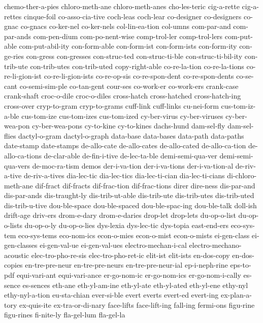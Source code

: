 {chemo-ther-a-pies
chloro-meth-ane
chloro-meth-anes
cho-les-teric
cig-a-rette
cig-a-rettes
cinque-foil
co-asso-cia-tive
coch-leas
coch-lear
co-designer
co-designers
co-gnac
co-gnacs
co-ker-nel
co-ker-nels
col-lin-ea-tion
col-umns
com-par-and
com-par-ands
com-pen-dium
com-po-nent-wise
comp-trol-ler
comp-trol-lers
com-put-able
com-put-abil-ity
con-form-able
con-form-ist
con-form-ists
con-form-ity
con-ge-ries
con-gress
con-gresses
con-struc-ted
con-struc-ti-ble
con-struc-ti-bil-ity
con-trib-ute
con-trib-utes
con-trib-uted
copy-right-able
co-re-la-tion
co-re-la-tions
co-re-li-gion-ist
co-re-li-gion-ists
co-re-op-sis
co-re-spon-dent
co-re-spon-dents
co-se-cant
co-semi-sim-ple
co-tan-gent
cour-ses
co-work-er
co-work-ers
crank-case
crank-shaft
croc-o-dile
croc-o-diles
cross-hatch
cross-hatched
cross-hatch-ing
cross-over
cryp-to-gram
cryp-to-grams
cuff-link
cuff-links
cu-nei-form
cus-tom-iz-a-ble
cus-tom-ize
cus-tom-izes
cus-tom-ized
cy-ber-virus
cy-ber-viruses
cy-ber-wea-pon
cy-ber-wea-pons
cy-to-kine
cy-to-kines
dachs-hund
dam-sel-fly
dam-sel-flies
dactyl-o-gram
dactyl-o-graph
data-base
data-bases
data-path
data-paths
date-stamp
date-stamps
de-allo-cate
de-allo-cates
de-allo-cated
de-allo-ca-tion
de-allo-ca-tions
de-clar-able
de-fin-i-tive
de-lec-ta-ble
demi-semi-qua-ver
demi-semi-qua-vers
de-moc-ra-tism
demos
der-i-va-tion
der-i-va-tions
der-i-va-tion-al
de-riv-a-tive
de-riv-a-tives
dia-lec-tic
dia-lec-tics
dia-lec-ti-cian
dia-lec-ti-cians
di-chloro-meth-ane
dif-fract
dif-fracts
dif-frac-tion
dif-frac-tions
direr
dire-ness
dis-par-and
dis-par-ands
dis-traught-ly
dis-trib-ut-able
dis-trib-ute
dis-trib-utes
dis-trib-uted
dis-trib-u-tive
dou-ble-space
dou-ble-spaced
dou-ble-spac-ing
dou-ble-talk
doll-ish
drift-age
driv-ers
drom-e-dary
drom-e-daries
drop-let
drop-lets
du-op-o-list
du-op-o-lists
du-op-o-ly
du-op-o-lies
dys-lexia
dys-lec-tic
dys-topia
east-end-ers
eco-sys-tem
eco-sys-tems
eco-nom-ics
econ-o-mies
econ-o-mist
econ-o-mists
ei-gen-class
ei-gen-classes
ei-gen-val-ue
ei-gen-val-ues
electro-mechan-i-cal
electro-mechano-acoustic
elec-tro-pho-re-sis
elec-tro-pho-ret-ic
elit-ist
elit-ists
en-dos-copy
en-dos-copies
en-tre-pre-neur
en-tre-pre-neurs
en-tre-pre-neur-ial
ep-i-neph-rine
eps-to-pdf
equi-vari-ant
equi-vari-ance
er-go-nom-ic
er-go-nom-ics
er-go-nom-i-cally
es-sence
es-sences
eth-ane
eth-yl-am-ine
eth-yl-ate
eth-yl-ated
eth-yl-ene
ethy-nyl
ethy-nyl-a-tion
eu-sta-chian
ever-si-ble
evert
everts
evert-ed
evert-ing
ex-plan-a-tory
ex-quis-ite
ex-tra-or-di-nary
face-lifts
face-lift-ing
fall-ing
fermi-ons
figu-rine
figu-rines
fi-nite-ly
fla-gel-lum
fla-gel-la
}

